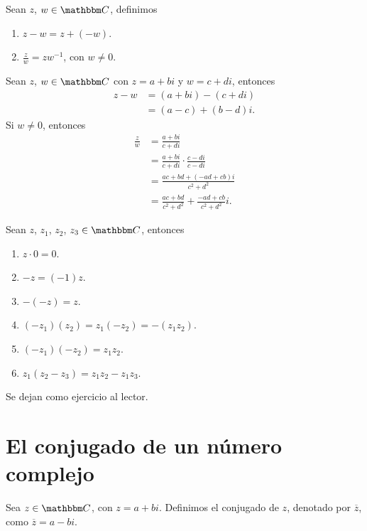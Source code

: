 \begin{definition}
    Sean $z$, $w \in \CC$, definimos
    \begin{enumerate}[label=\roman*.]
        \item $z-w=z+(-w)$.
        \item $\displaystyle \frac{z}{w}=zw^{-1}$, con $w \neq 0$.
    \end{enumerate}
\end{definition}

\begin{observation}
    Sean $z$, $w \in \CC$ con $z=a+bi$ y $w=c+di$, entonces
    \begin{align*}
        z-w &=(a+bi)-(c+di) \\
        &=(a-c)+(b-d)i.
    \end{align*}
    Si $w \neq 0$, entonces
    \begin{align*}
        \frac{z}{w} &= \frac{a+bi}{c+di} \\
        &= \frac{a+bi}{c+di} \cdot \frac{c-di}{c-di} \\
        &= \frac{ac+bd+(-ad+cb)i}{c^2+d^2} \\
        & =\frac{ac+bd}{c^2+d^2} + \frac{-ad+cb}{c^2+d^2} i.
    \end{align*}
\end{observation}

\begin{proposition}
    Sean $z$, $z_1$, $z_2$, $z_3 \in \CC$, entonces
    \begin{enumerate}[label=\roman*.]
        \item $z \cdot 0=0$.
        \item $-z=(-1)z$.
        \item $-(-z)=z$.
        \item $(-z_1)(z_2)=z_1(-z_2)=-(z_1z_2)$.
        \item $(-z_1)(-z_2)=z_1z_2$.
        \item $z_1(z_2-z_3)=z_1z_2-z_1z_3$.
    \end{enumerate}
    \demostracion Se dejan como ejercicio al lector.
\end{proposition}

\section{El conjugado de un número complejo}

\begin{definition}
    Sea $z \in \CC$, con $z=a+bi$. Definimos el conjugado de $z$, denotado por $\overline{z}$, como $\overline{z} =a-bi$.
\end{definition}

